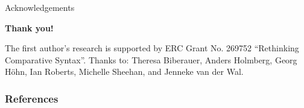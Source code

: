 \documentclass[12pt]{beamer}
\begin{document}
\begin{frame}{Acknowledgements}

\begin{center}
    \Large \textbf{Thank you!}
\end{center}

The first author's research is supported by ERC Grant No. 269752
\enquote{Rethinking Comparative Syntax}. Thanks to: Theresa Biberauer, Anders
Holmberg, Georg Höhn, Ian Roberts, Michelle Sheehan, and Jenneke van der Wal.

\end{frame}

\begin{frame}[t, allowframebreaks]

    \frametitle{References}
    \newrefcontext[sorting=nyt]
    \renewcommand*{\bibfont}{\footnotesize}
    \printbibliography[heading=none]

\end{frame}
\end{document}
